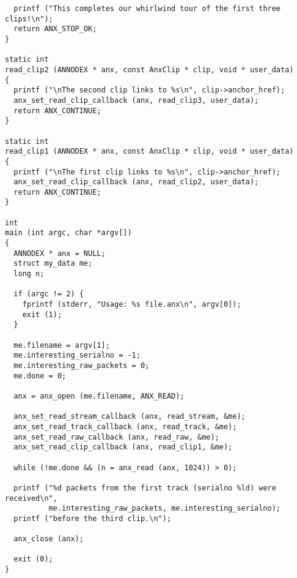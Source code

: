 \begin{verbatim}
  printf ("This completes our whirlwind tour of the first three clips!\n");
  return ANX_STOP_OK;
}

static int
read_clip2 (ANNODEX * anx, const AnxClip * clip, void * user_data)
{
  printf ("\nThe second clip links to %s\n", clip->anchor_href);
  anx_set_read_clip_callback (anx, read_clip3, user_data);
  return ANX_CONTINUE;
}

static int
read_clip1 (ANNODEX * anx, const AnxClip * clip, void * user_data)
{
  printf ("\nThe first clip links to %s\n", clip->anchor_href);
  anx_set_read_clip_callback (anx, read_clip2, user_data);
  return ANX_CONTINUE;
}

int
main (int argc, char *argv[])
{
  ANNODEX * anx = NULL;
  struct my_data me;
  long n;

  if (argc != 2) {
    fprintf (stderr, "Usage: %s file.anx\n", argv[0]);
    exit (1);
  }

  me.filename = argv[1];
  me.interesting_serialno = -1;
  me.interesting_raw_packets = 0;
  me.done = 0;

  anx = anx_open (me.filename, ANX_READ);

  anx_set_read_stream_callback (anx, read_stream, &me);
  anx_set_read_track_callback (anx, read_track, &me);
  anx_set_read_raw_callback (anx, read_raw, &me);
  anx_set_read_clip_callback (anx, read_clip1, &me);

  while (!me.done && (n = anx_read (anx, 1024)) > 0);

  printf ("%d packets from the first track (serialno %ld) were received\n",
          me.interesting_raw_packets, me.interesting_serialno);
  printf ("before the third clip.\n");

  anx_close (anx);

  exit (0);
}
\end{verbatim}
\normalsize



